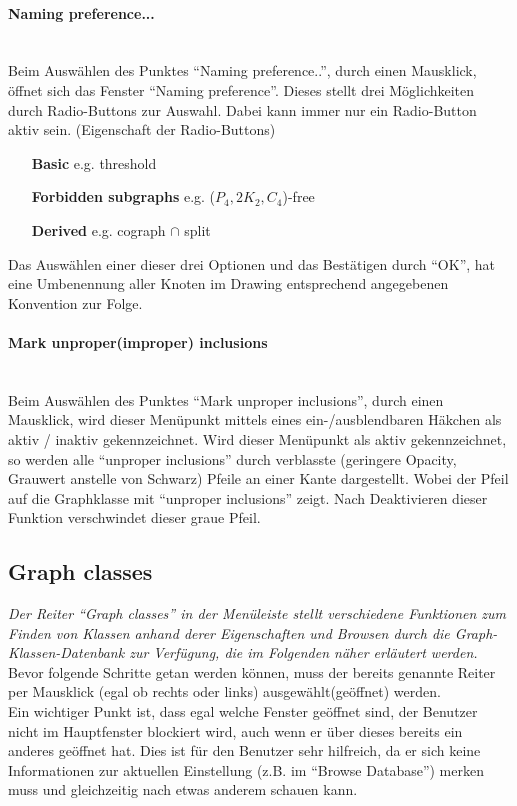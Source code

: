 \documentclass[10pt,a4paper]{article}
\begin{document}
\paragraph{Naming preference...}\ \\
Beim Auswählen des Punktes "`Naming preference.."', durch einen Mausklick, öffnet sich das Fenster "`Naming preference"'. Dieses stellt drei Möglichkeiten durch Radio-Buttons zur Auswahl. Dabei kann immer nur ein Radio-Button aktiv sein. (Eigenschaft der Radio-Buttons) \\
\begin{itemize}
	\item[\bf{Basic}] e.g. threshold
	\item[\bf{Forbidden subgraphs}] e.g. ($P_4,2K_2,C_4$)-free
	\item[\bf{Derived}] e.g. cograph $\cap$ split\\
\end{itemize}
Das Auswählen einer dieser drei Optionen und das Bestätigen durch "`OK"', hat eine Umbenennung aller Knoten im Drawing entsprechend angegebenen Konvention zur Folge.

\paragraph{Mark unproper(improper) inclusions}\ \\
Beim Auswählen des Punktes "`Mark unproper inclusions"', durch einen Mausklick, wird dieser Menüpunkt mittels eines ein-/ausblendbaren Häkchen als aktiv / inaktiv gekennzeichnet. Wird dieser Menüpunkt als aktiv gekennzeichnet, so werden alle "`unproper inclusions"' durch verblasste (geringere Opacity, Grauwert anstelle von Schwarz) Pfeile an einer Kante dargestellt. Wobei der Pfeil auf die Graphklasse mit "`unproper inclusions"' zeigt. Nach Deaktivieren dieser Funktion verschwindet dieser graue Pfeil.


\subsection{Graph classes}
\emph{Der Reiter "`Graph classes"' in der Menüleiste stellt verschiedene Funktionen zum Finden von Klassen anhand derer Eigenschaften und Browsen durch die Graph-Klassen-Datenbank zur Verfügung, die im Folgenden näher erläutert werden.}
Bevor folgende Schritte getan werden können, muss der bereits genannte Reiter per Mausklick (egal ob rechts oder links) ausgewählt(geöffnet) werden.\\
Ein wichtiger Punkt ist, dass egal welche Fenster geöffnet sind, der Benutzer nicht im Hauptfenster blockiert wird, auch wenn er über dieses bereits ein anderes geöffnet hat. Dies ist für den Benutzer sehr hilfreich, da er sich keine Informationen zur aktuellen Einstellung (z.B. im "`Browse Database"') merken muss und gleichzeitig nach etwas anderem schauen kann.
\end{document}
